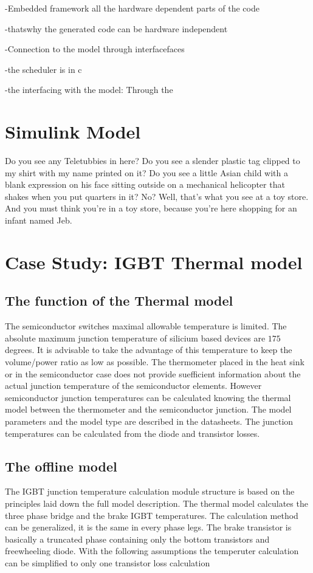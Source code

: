 -Embedded framework all the hardware dependent parts of the code

-thatswhy the generated code can be hardware independent

-Connection to the model through interfacefaces

-the scheduler is in c 

-the interfacing with the model: Through the  

\section{Simulink Model}
Do you see any Teletubbies in here? Do you see a slender plastic tag clipped to my shirt with my name printed on it? Do you see a little Asian child with a blank expression on his face sitting outside on a mechanical helicopter that shakes when you put quarters in it? No? Well, that's what you see at a toy store. And you must think you're in a toy store, because you're here shopping for an infant named Jeb.

\section{Case Study: IGBT Thermal model}

\subsection{The function of the Thermal model}
The semiconductor switches maximal allowable temperature is limited. The absolute maximum junction temperature of silicium based devices  are $175$ degrees. It is advisable to take the advantage of this temperature to keep the volume/power ratio as low as possible. The thermometer placed in the heat sink or in the semiconductor case does not provide suefficient information about the actual junction temperature of the semiconductor elements. However semiconductor junction temperatures can be calculated knowing the thermal model between the thermometer and the semiconductor junction. The model parameters and the model type are described in the datasheets. The junction temperatures can be calculated from the diode and transistor losses.

\subsection{The offline model}
The IGBT junction temperature calculation module structure is based on the principles laid down the full model description. The thermal model calculates the three phase bridge and the brake IGBT temperatures. The calculation method can be generalized, it is the same in every phase legs. The brake transistor is basically a truncated phase containing only the bottom transistors and freewheeling diode. With the following assumptions the temperuter calculation can be simplified to only one transistor loss calculation

